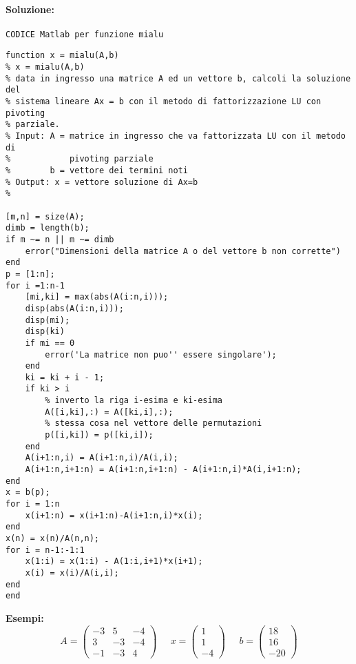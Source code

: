 \documentclass[12pt]{article}
\begin{document}
\paragraph{Soluzione:}
\texttt{CODICE Matlab per funzione mialu}
\begin{lstlisting}[frame=single]
function x = mialu(A,b)
% x = mialu(A,b)
% data in ingresso una matrice A ed un vettore b, calcoli la soluzione del 
% sistema lineare Ax = b con il metodo di fattorizzazione LU con pivoting 
% parziale. 
% Input: A = matrice in ingresso che va fattorizzata LU con il metodo di 
%            pivoting parziale
%        b = vettore dei termini noti
% Output: x = vettore soluzione di Ax=b
%

[m,n] = size(A);
dimb = length(b);
if m ~= n || m ~= dimb
    error("Dimensioni della matrice A o del vettore b non corrette")
end
p = [1:n];
for i =1:n-1
    [mi,ki] = max(abs(A(i:n,i)));
    disp(abs(A(i:n,i)));
    disp(mi);
    disp(ki)
    if mi == 0
        error('La matrice non puo'' essere singolare');
    end
    ki = ki + i - 1;
    if ki > i 
        % inverto la riga i-esima e ki-esima
        A([i,ki],:) = A([ki,i],:);
        % stessa cosa nel vettore delle permutazioni
        p([i,ki]) = p([ki,i]);
    end
    A(i+1:n,i) = A(i+1:n,i)/A(i,i);
    A(i+1:n,i+1:n) = A(i+1:n,i+1:n) - A(i+1:n,i)*A(i,i+1:n);
end
x = b(p);
for i = 1:n
    x(i+1:n) = x(i+1:n)-A(i+1:n,i)*x(i);
end
x(n) = x(n)/A(n,n);
for i = n-1:-1:1
    x(1:i) = x(1:i) - A(1:i,i+1)*x(i+1);
    x(i) = x(i)/A(i,i);
end
end
\end{lstlisting}
\textbf{Esempi:}
\begin{equation}A=
    \begin{pmatrix}
        -3 & 5 & -4 \\
        3 & -3 & -4 \\
        -1 & -3 & 4 
    \end{pmatrix}\;\;\;\;\;x=
    \begin{pmatrix}
        1 \\
        1 \\
        -4  
    \end{pmatrix}\;\;\;\;\;b=
    \begin{pmatrix}
        18 \\
        16\\
        -20  
    \end{pmatrix}
\end{equation}
\end{document}
